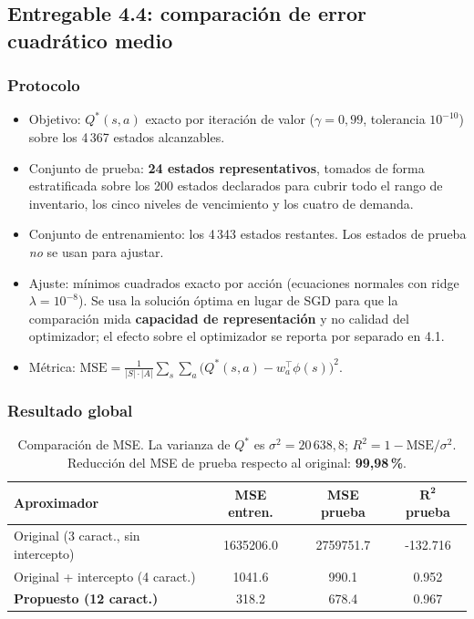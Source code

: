 \documentclass[11pt,letterpaper]{article}
\begin{document}
\subsection{Entregable 4.4: comparación de error cuadrático medio}
\label{sec:44}

\subsubsection*{Protocolo}

\begin{itemize}[leftmargin=*]
  \item Objetivo: $Q^{*}(s,a)$ exacto por iteración de valor ($\gamma = 0{,}99$,
        tolerancia $10^{-10}$) sobre los 4\,367 estados alcanzables.
  \item Conjunto de prueba: \textbf{24 estados representativos}, tomados de forma
        estratificada sobre los 200 estados declarados para cubrir todo el rango de
        inventario, los cinco niveles de vencimiento y los cuatro de demanda.
  \item Conjunto de entrenamiento: los 4\,343 estados restantes. Los estados de
        prueba \emph{no} se usan para ajustar.
  \item Ajuste: mínimos cuadrados exacto por acción (ecuaciones normales con ridge
        $\lambda = 10^{-8}$). Se usa la solución óptima en lugar de SGD para que la
        comparación mida \textbf{capacidad de representación} y no calidad del
        optimizador; el efecto sobre el optimizador se reporta por separado en 4.1.
  \item Métrica: $\mathrm{MSE} = \frac{1}{|S|\cdot|A|}\sum_{s}\sum_{a}
        \bigl(Q^{*}(s,a) - w_a^{\top}\phi(s)\bigr)^{2}$.
\end{itemize}

\subsubsection*{Resultado global}

\begin{table}[h]
\centering
\begin{tabular}{lS[table-format=7.1]S[table-format=7.1]S[table-format=-3.3]}
\toprule
\textbf{Aproximador} & {\textbf{MSE entren.}} & {\textbf{MSE prueba}} & {$\bm{R^2}$ \textbf{prueba}} \\
\midrule
Original (3 caract., sin intercepto)      & 1635206.0 & 2759751.7 & -132.716 \\
Original + intercepto (4 caract.)         & 1041.6    & 990.1     & 0.952 \\
\textbf{Propuesto (12 caract.)}           & 318.2     & 678.4     & 0.967 \\
\bottomrule
\end{tabular}
\caption{Comparación de MSE. La varianza de $Q^{*}$ es
$\sigma^2 = 20\,638{,}8$; $R^2 = 1 - \mathrm{MSE}/\sigma^2$.
Reducción del MSE de prueba respecto al original: \textbf{99{,}98\,\%}.}
\label{tab:mse}
\end{table}
\end{document}
